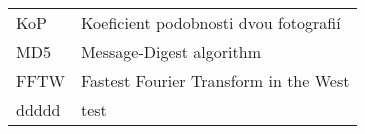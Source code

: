 
\seznamzkr

\begin{tabular}{ll}
  KoP	& Koeficient podobnosti dvou fotografií	\\
  MD5	& Message-Digest algorithm				\\
  FFTW	& Fastest Fourier Transform in the West \\
  ddddd	& test
\end{tabular}

